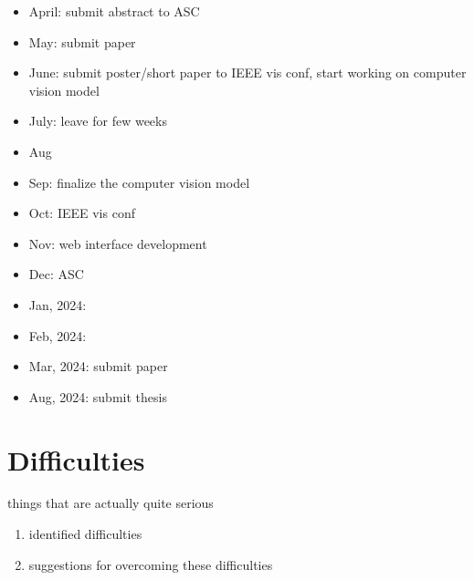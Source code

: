 \documentclass[11pt,a4paper,]{article}
\providecommand{\tightlist}{%
  \setlength{\itemsep}{0pt}\setlength{\parskip}{0pt}}
\begin{document}
\begin{itemize}
\item
  April: submit abstract to ASC
\item
  May: submit paper
\item
  June: submit poster/short paper to IEEE vis conf, start working on computer vision model
\item
  July: leave for few weeks
\item
  Aug
\item
  Sep: finalize the computer vision model
\item
  Oct: IEEE vis conf
\item
  Nov: web interface development
\item
  Dec: ASC
\item
  Jan, 2024:
\item
  Feb, 2024:
\item
  Mar, 2024: submit paper
\item
  Aug, 2024: submit thesis
\end{itemize}

\hypertarget{difficulties}{%
\section{Difficulties}\label{difficulties}}

things that are actually quite serious

\begin{enumerate}
\def\labelenumi{\arabic{enumi}.}
\tightlist
\item
  identified difficulties
\item
  suggestions for overcoming these difficulties
\end{enumerate}

\printbibliography[title=References]
\end{document}
